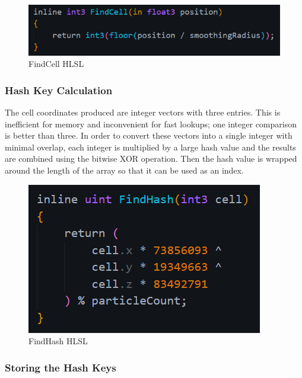 \documentclass[12pt]{article}
\begin{document}
    \begin{figure}[H]
        \begin{center}
            \includegraphics[]{findCell.png}
            \caption{FindCell HLSL}
        \end{center}
    \end{figure}

    \subsubsection{Hash Key Calculation}

    The cell coordinates produced are integer vectors with three entries. This is inefficient for memory and inconvenient for fast lookups; one integer comparison is better than three. In order to convert these vectors into a single integer with minimal overlap, each integer is multiplied by a large hash value and the results are combined using the bitwise XOR operation. Then the hash value is wrapped around the length of the array so that it can be used as an index.

    \begin{figure}[H]
        \begin{center}
            \includegraphics[]{findHash.png}
            \caption{FindHash HLSL}
        \end{center}
    \end{figure}

    \subsubsection{Storing the Hash Keys}
\end{document}
